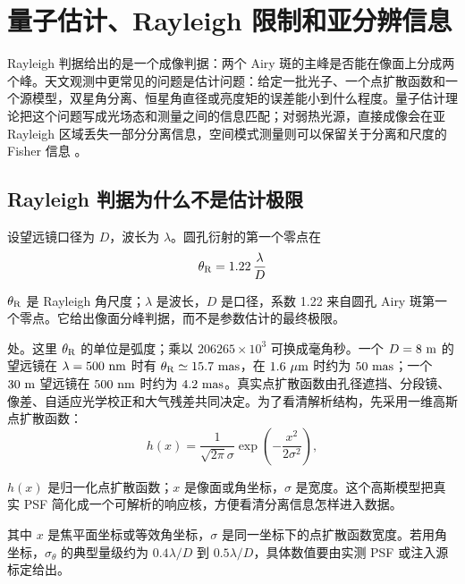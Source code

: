 \chapter{量子估计、Rayleigh 限制和亚分辨信息}
\label{chap:08}

\begin{chapteropening}
Rayleigh 判据给出的是一个成像判据：两个 Airy 斑的主峰是否能在像面上分成两个峰。天文观测中更常见的问题是估计问题：给定一批光子、一个点扩散函数和一个源模型，双星角分离、恒星角直径或亮度矩的误差能小到什么程度。量子估计理论把这个问题写成光场态和测量之间的信息匹配；对弱热光源，直接成像会在亚 Rayleigh 区域丢失一部分分离信息，空间模式测量则可以保留关于分离和尺度的 Fisher 信息 \citep{1925PCPS...22..700F,1969JSP.....1..231H,2000PhRvL..85.3789K,2016PhRvX...6c1033T,2016OExpr..24.3684N,2017NJPh...19b3054T}。
\end{chapteropening}

\section{Rayleigh 判据为什么不是估计极限}

设望远镜口径为 \(D\)，波长为 \(\lambda\)。圆孔衍射的第一个零点在
\begin{equation}
  \theta_{\rm R}=1.22\,\frac{\lambda}{D}
  \label{eq:ch08-rayleigh}
\end{equation}
\begin{formulaexplain}
\(\theta_{\rm R}\) 是 Rayleigh 角尺度；\(\lambda\) 是波长，\(D\) 是口径，系数 1.22 来自圆孔 Airy 斑第一个零点。它给出像面分峰判据，而不是参数估计的最终极限。
\end{formulaexplain}
处。这里 \(\theta_{\rm R}\) 的单位是弧度；乘以 \(206265\times10^3\) 可换成毫角秒。一个 \(D=8~{\rm m}\) 的望远镜在 \(\lambda=500~{\rm nm}\) 时有 \(\theta_{\rm R}\simeq 15.7~{\rm mas}\)，在 \(1.6~\mu{\rm m}\) 时约为 \(50~{\rm mas}\)；一个 \(30~{\rm m}\) 望远镜在 \(500~{\rm nm}\) 时约为 \(4.2~{\rm mas}\)。真实点扩散函数由孔径遮挡、分段镜、像差、自适应光学校正和大气残差共同决定。为了看清解析结构，先采用一维高斯点扩散函数：
\begin{equation}
  h(x)=\frac{1}{\sqrt{2\pi}\sigma}
       \exp\!\left(-\frac{x^2}{2\sigma^2}\right),
  \label{eq:ch08-gaussian-psf}
\end{equation}
\begin{formulaexplain}
\(h(x)\) 是归一化点扩散函数；\(x\) 是像面或角坐标，\(\sigma\) 是宽度。这个高斯模型把真实 PSF 简化成一个可解析的响应核，方便看清分离信息怎样进入数据。
\end{formulaexplain}
其中 \(x\) 是焦平面坐标或等效角坐标，\(\sigma\) 是同一坐标下的点扩散函数宽度。若用角坐标，\(\sigma_\theta\) 的典型量级约为 \(0.4\lambda/D\) 到 \(0.5\lambda/D\)，具体数值要由实测 PSF 或注入源标定给出。

